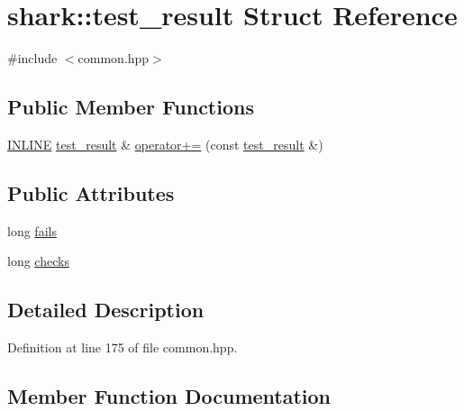 \hypertarget{structshark_1_1test__result}{}\section{shark\+:\+:test\+\_\+result Struct Reference}
\label{structshark_1_1test__result}


{\ttfamily \#include $<$common.\+hpp$>$}

\subsection*{Public Member Functions}
\begin{DoxyCompactItemize}
\item 
\hyperlink{common_8hpp_a2eb6f9e0395b47b8d5e3eeae4fe0c116}{I\+N\+L\+I\+NE} \hyperlink{structshark_1_1test__result}{test\+\_\+result} \& \hyperlink{structshark_1_1test__result_a3867b11cc3dfa99dce6032833ecb8c93}{operator+=} (const \hyperlink{structshark_1_1test__result}{test\+\_\+result} \&)
\end{DoxyCompactItemize}
\subsection*{Public Attributes}
\begin{DoxyCompactItemize}
\item 
long \hyperlink{structshark_1_1test__result_ae113beda360d33cf4ae3ad104a965c88}{fails}
\item 
long \hyperlink{structshark_1_1test__result_a246d092279ca7ba48d6723e1fe667291}{checks}
\end{DoxyCompactItemize}


\subsection{Detailed Description}


Definition at line 175 of file common.\+hpp.



\subsection{Member Function Documentation}
\hypertarget{structshark_1_1test__result_a3867b11cc3dfa99dce6032833ecb8c93}{}\label{structshark_1_1test__result_a3867b11cc3dfa99dce6032833ecb8c93} 

